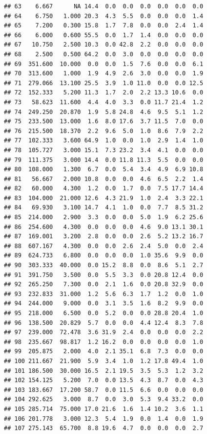 \documentclass[]{report}
\begin{document}
\begin{verbatim}
## 63    6.667      NA 14.4  0.0  0.0  0.0  0.0  0.0  0.0
## 64    6.750   1.000 20.3  4.3  5.5  0.0  0.0  0.0  1.4
## 65    7.200   0.300 15.8  1.7  7.8  0.0  0.0  2.4  1.4
## 66    6.000   0.600 55.5  0.0  1.7  1.4  0.0  0.0  0.0
## 67   10.750   2.500 10.3  0.0 42.8  2.2  0.0  0.0  0.0
## 68    2.500   0.500 64.2  0.0  3.0  0.0  0.0  0.0  0.0
## 69  351.600  10.000  0.0  0.0  1.5  7.6  0.0  0.0  6.1
## 70  313.600   1.000  1.9  4.9  2.6  3.0  0.0  0.0  1.9
## 71  279.066  13.100 25.5  3.9  1.0 11.0  0.0  0.0 12.5
## 72  152.333   5.200 11.3  1.7  2.0  2.2 13.3 10.6  0.0
## 73   58.623  11.600  4.4  4.0  3.3  0.0 11.7 21.4  1.2
## 74  249.250  20.870  1.9  5.8 24.8  4.6  9.5  5.1  1.2
## 75  233.500  13.000  1.6  8.0 17.6  3.7 11.5  7.0  0.0
## 76  215.500  18.370  2.2  9.6  5.0  1.0  8.6  7.9  2.2
## 77  102.333   3.600 64.9  1.0  0.0  1.0  2.9  1.4  1.0
## 78  105.727   3.000 15.1  7.3 23.2  3.4  4.1  0.0  0.0
## 79  111.375   3.000 14.4  0.0 11.8 11.3  5.5  0.0  0.0
## 80  108.000   1.300  6.7  0.0  5.4  3.4  4.9  6.9 10.8
## 81   56.667   2.000 10.8  0.0  0.0  4.6  6.5  2.2  1.4
## 82   60.000   4.300  1.2  0.0  1.7  0.0  7.5 17.7 14.4
## 83  104.000  21.000 12.6  4.3 21.9  1.0  2.4  3.3 22.1
## 84   69.930   3.100 14.7  4.1  1.0  0.0  7.7  8.5 31.2
## 85  214.000   2.900  3.3  0.0  0.0  5.0  1.9  6.2 25.6
## 86  254.600   4.300  0.0  0.0  0.0  4.6  9.0 13.1 30.1
## 87  169.001   3.200  2.8  0.0  0.0  2.6  5.2 13.2 16.7
## 88  607.167   4.300  0.0  0.0  2.6  2.4  5.0  0.0  2.4
## 89  624.733   6.800  0.0  0.0  0.0  1.0 35.6  9.9  0.0
## 90  303.333  40.000  0.0 15.2  8.8  0.0  8.6  5.1  2.7
## 91  391.750   3.500  0.0  5.5  3.3  0.0 20.8 12.4  0.0
## 92  265.250   7.300  0.0  2.1  1.6  0.0 20.8 32.9  0.0
## 93  232.833  31.000  1.2  5.6  6.3  1.7  1.2  0.0  1.0
## 94  244.000   9.000  0.0  3.1  3.5  1.6  8.2  9.9  0.0
## 95  218.000   6.500  0.0  5.2  0.0  0.0 28.8 20.4  1.0
## 96  138.500  20.829  5.7  0.0  0.0  4.4 12.4  8.3  7.8
## 97  239.000  72.478  3.6 31.9  2.4  0.0  0.0  0.0  2.2
## 98  235.667  98.817  1.2 16.2  0.0  0.0  0.0  0.0  1.0
## 99  205.875   2.000  4.0  2.1 35.1  6.8  7.3  0.0  0.0
## 100 211.667  21.900  5.9  3.4  1.0  1.2 17.8 49.4  1.0
## 101 186.500  30.000 16.5  2.1 19.5  3.5  5.3  1.2  3.2
## 102 154.125   5.200  7.0  0.0 13.5  4.3  8.7  0.0  4.3
## 103 183.667  17.200 58.7  0.0 11.5  6.6  0.0  0.0  0.0
## 104 292.625   3.000  8.7  0.0  3.0  5.3  9.4 33.2  0.0
## 105 285.714  75.000 17.0 21.6  1.6  1.4 10.2  3.6  1.1
## 106 201.778   3.000 12.3  5.4  1.9  0.0  1.4  0.0  1.9
## 107 275.143  65.700  8.8 19.6  4.7  0.0  0.0  0.0  2.7

\end{verbatim}
\end{document}
